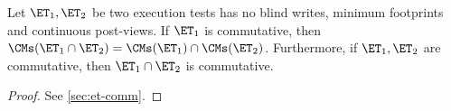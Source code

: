 \begin{theorem}                                                                            
Let $\ET_1, \ET_2$ be two execution tests has no blind writes, minimum footprints and continuous post-views.
If $\ET_1$ is commutative, 
then $\CMs(\ET_1 \cap \ET_2) = \CMs(\ET_1) \cap \CMs(\ET_2)$. 
Furthermore, if $\ET_1, \ET_2$ are commutative, then $\ET_1 \cap \ET_2$ 
is commutative.
\end{theorem}
\begin{proof}
    See \cref{sec:et-comm}.
\end{proof}
